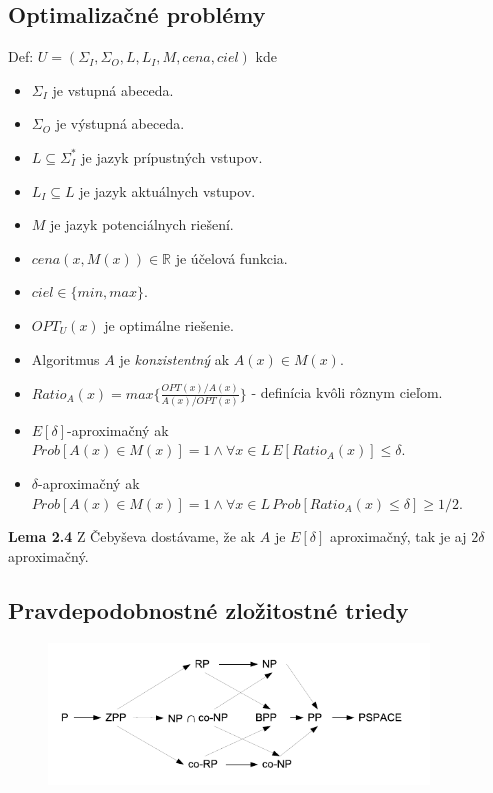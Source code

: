 \documentclass[12pt,a4paper]{article}
\begin{document}
  \subsection{Optimalizačné problémy} 
  Def: $U = (\Sigma_I, \Sigma_O, L, L_I, M, cena, ciel)$ kde 
  \begin{itemize}
    \item $\Sigma_I$ je vstupná abeceda.
    \item $\Sigma_O$ je výstupná abeceda.
    \item $L \subseteq \Sigma_I^{*}$ je jazyk prípustných vstupov.
    \item $L_I \subseteq L$ je jazyk aktuálnych vstupov.
    \item $M$ je jazyk potenciálnych riešení.
    \item $cena(x,M(x)) \in \mathbb{R}$ je účelová funkcia.
    \item $ciel \in \{min, max\}$.
    \item $OPT_U(x)$ je optimálne riešenie.
    \item Algoritmus $A$ je \emph{konzistentný} ak $A(x) \in M(x)$. 
    \item $Ratio_A(x) = max\{\frac{OPT(x)/A(x)}{A(x)/OPT(x)}\}$ - definícia kvôli rôznym cieľom. 
    \item $E[\delta]$-aproximačný ak $Prob[A(x) \in M(x)] = 1 \wedge \forall x \in L \, E[Ratio_A(x)] \leq \delta$. 
    \item $\delta$-aproximačný ak $Prob[A(x) \in M(x)] = 1 \wedge \forall x \in L \, Prob[Ratio_A(x) \leq \delta] \geq 1/2$. 
  \end{itemize} 
  
  {\bf Lema 2.4} Z Čebyševa dostávame, že ak $A$ je $E[\delta]$ aproximačný, tak je aj $2 \delta$ aproximačný. 
  
\subsection{Pravdepodobnostné zložitostné triedy}
\begin{figure}[H]
  \centering
  \includegraphics[width=0.9\textwidth]{hierarchy.png}
\end{figure}
\end{document}
